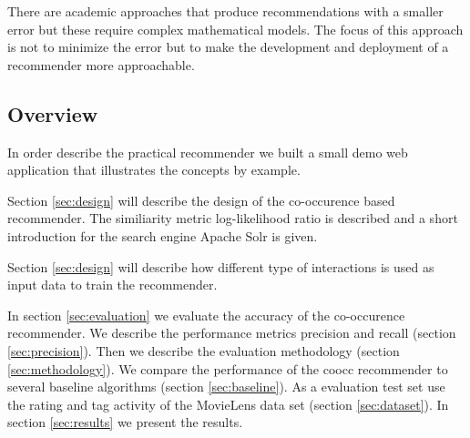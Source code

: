 There are academic approaches that produce recommendations with a smaller error but these require complex mathematical models. The focus of this approach is not to minimize the error but to make the development and deployment of a recommender more approachable.

\subsection{Overview}

In order describe the practical recommender we built a small demo web application that illustrates the concepts by example.

Section \ref{sec:design} will describe the design of the co-occurence based recommender. The similiarity metric log-likelihood ratio is described and a short introduction for the search engine Apache Solr is given.

Section \ref{sec:design} will describe how different type of interactions is used as input data to train the recommender.

In section \ref{sec:evaluation} we evaluate the accuracy of the co-occurence recommender. We describe the performance metrics \gls{precision} and \gls{recall} (section \ref{sec:precision}). Then we describe the evaluation methodology (section \ref{sec:methodology}). We compare the performance of the \gls{coocc} recommender to several baseline algorithms (section \ref{sec:baseline}). As a evaluation test set use the rating and tag activity of the MovieLens data set (section \ref{sec:dataset}). In section \ref{sec:results} we present the results.